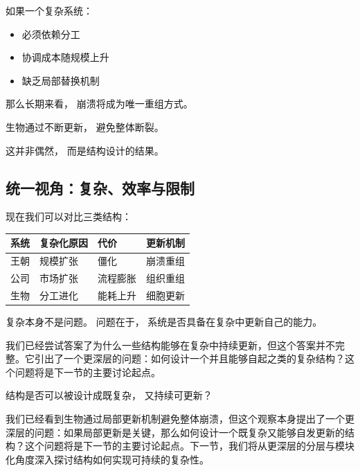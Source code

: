 \documentclass[../main.tex]{subfiles}
\begin{document}
如果一个复杂系统：

\begin{itemize}
	\item 必须依赖分工
	\item 协调成本随规模上升
	\item 缺乏局部替换机制
\end{itemize}

那么长期来看，
崩溃将成为唯一重组方式。

生物通过不断更新，
避免整体断裂。

这并非偶然，
而是结构设计的结果。

\subsection{统一视角：复杂、效率与限制}

现在我们可以对比三类结构：

\begin{center}
	\begin{tabular}{llll}
		\toprule
		系统 & 复杂化原因 & 代价 & 更新机制 \\
		\midrule
		王朝 & 规模扩张 & 僵化 & 崩溃重组 \\
		公司 & 市场扩张 & 流程膨胀 & 组织重组 \\
		生物 & 分工进化 & 能耗上升 & 细胞更新 \\
		\bottomrule
	\end{tabular}
\end{center}

\begin{readingnote}
	复杂本身不是问题。
	问题在于，
	系统是否具备在复杂中更新自己的能力。
\end{readingnote}

我们已经尝试答案了为什么一些结构能够在复杂中持续更新，但这个答案并不完整。它引出了一个更深层的问题：如何设计一个并且能够自起之类的复杂结构？这个问题将是下一节的主要讨论起点。

\begin{questionbox}
	结构是否可以被设计成既复杂，
	又持续可更新？
\end{questionbox}

我们已经看到生物通过局部更新机制避免整体崩溃，但这个观察本身提出了一个更深层的问题：如果局部更新是关键，那么如何设计一个既复杂又能够自发更新的结构？这个问题将是下一节的主要讨论起点。下一节，我们将从更深层的分层与模块化角度深入探讨结构如何实现可持续的复杂性。

\end{document}

